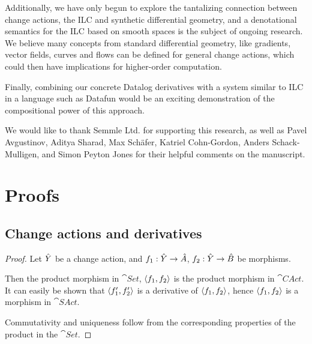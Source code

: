 Additionally, we have only begun to explore the tantalizing connection between
change actions, the ILC and synthetic
differential geometry, and a denotational semantics for the
ILC based on smooth spaces is the subject of ongoing research. We believe many concepts
from standard differential geometry, like gradients, vector fields, curves and flows can
be defined for general change actions, which could then have implications for higher-order
computation.

Finally, combining our concrete Datalog derivatives with a system similar to ILC
in a language such as Datafun would be an exciting demonstration of the compositional
power of this approach.

\begin{acks}

We would like to thank Semmle Ltd. for supporting this research, as well as Pavel
Avgustinov, Aditya Sharad, Max Sch\"afer, Katriel Cohn-Gordon, Anders
Schack-Mulligen, and Simon Peyton Jones for their
helpful comments on the manuscript.

\end{acks}

\printbibliography

\clearpage
\appendix
\appendixpage
\section{Proofs}

\subsection{Change actions and derivatives}

\products*
\begin{proof}
  \label{prf:products}
  Let $\hat{Y}$ be a change action, and $f_1: \hat{Y} \rightarrow \hat{A}$, $f_2: \hat{Y}
  \rightarrow \hat{B}$ be morphisms.

  Then the product morphism in $\cat{Set}$, $\left\langle {f_1}, {f_2} \right\rangle$ is the product
  morphism in $\cat{CAct}$. It can easily be
  shown that $\left\langle {f_1'}, {f_2'} \right\rangle$ is a derivative of $\left\langle {f_1}, {f_2} \right\rangle$,
  hence $\left\langle {f_1}, {f_2} \right\rangle$ is a morphism in $\cat{SAct}$.

  Commutativity and uniqueness follow from the corresponding properties of the
  product in the $\cat{Set}$.
\end{proof}

